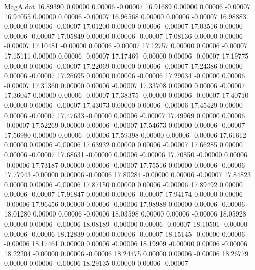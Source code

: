\begin{filecontents}{MagA.dat}
  16.89390    0.00000    0.00006   -0.00007
  16.91689    0.00000    0.00006   -0.00007
  16.94055    0.00000    0.00006   -0.00007
  16.96568    0.00000    0.00006   -0.00007
  16.98883    0.00000    0.00006   -0.00007
  17.01200    0.00000    0.00006   -0.00007
  17.03516    0.00000    0.00006   -0.00007
  17.05849    0.00000    0.00006   -0.00007
  17.08136    0.00000    0.00006   -0.00007
  17.10481   -0.00000    0.00006   -0.00007
  17.12757    0.00000    0.00006   -0.00007
  17.15111    0.00000    0.00006   -0.00007
  17.17469   -0.00000    0.00006   -0.00007
  17.19775    0.00000    0.00006   -0.00007
  17.22069    0.00000    0.00006   -0.00007
  17.24386    0.00000    0.00006   -0.00007
  17.26695    0.00000    0.00006   -0.00006
  17.29034   -0.00000    0.00006   -0.00007
  17.31360    0.00000    0.00006   -0.00007
  17.33708    0.00000    0.00006   -0.00007
  17.36047    0.00000    0.00006   -0.00007
  17.38375   -0.00000    0.00006   -0.00007
  17.40710    0.00000    0.00006   -0.00007
  17.43073    0.00000    0.00006   -0.00006
  17.45429    0.00000    0.00006   -0.00007
  17.47633   -0.00000    0.00006   -0.00007
  17.49969    0.00000    0.00006   -0.00007
  17.52269    0.00000    0.00006   -0.00007
  17.54673    0.00000    0.00006   -0.00007
  17.56980    0.00000    0.00006   -0.00006
  17.59398    0.00000    0.00006   -0.00006
  17.61612    0.00000    0.00006   -0.00006
  17.63932    0.00000    0.00006   -0.00007
  17.66285    0.00000    0.00006   -0.00007
  17.68631   -0.00000    0.00006   -0.00006
  17.70850   -0.00000    0.00006   -0.00006
  17.73187    0.00000    0.00006   -0.00007
  17.75516    0.00000    0.00006   -0.00006
  17.77943   -0.00000    0.00006   -0.00006
  17.80284   -0.00000    0.00006   -0.00007
  17.84823    0.00000    0.00006   -0.00006
  17.87150    0.00000    0.00006   -0.00006
  17.89492    0.00000    0.00006   -0.00007
  17.91847    0.00000    0.00006   -0.00007
  17.94174    0.00000    0.00006   -0.00006
  17.96456    0.00000    0.00006   -0.00006
  17.98988    0.00000    0.00006   -0.00006
  18.01280    0.00000    0.00006   -0.00006
  18.03598    0.00000    0.00006   -0.00006
  18.05928    0.00000    0.00006   -0.00006
  18.08189   -0.00000    0.00006   -0.00007
  18.10501   -0.00000    0.00006   -0.00006
  18.12839    0.00000    0.00006   -0.00007
  18.15145   -0.00000    0.00006   -0.00006
  18.17461    0.00000    0.00006   -0.00006
  18.19909   -0.00000    0.00006   -0.00006
  18.22204   -0.00000    0.00006   -0.00006
  18.24475    0.00000    0.00006   -0.00006
  18.26779    0.00000    0.00006   -0.00006
  18.29135    0.00000    0.00006   -0.00007

\end{filecontents}
